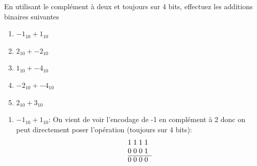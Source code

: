 \documentclass[12pt]{article}
\newenvironment{MaReponse}
		{\begin{greyedtextbox}\itshape} %
		{\end{greyedtextbox}}            %
\newenvironment{alphenum}
{\begin{enumerate}[label=\alph*.]}
	{\end{enumerate}}
\begin{document}
	\begin{MonExo}
		En utilisant le complément à deux et toujours sur 4 bits, effectuez les additions binaires suivantes
		\begin{alphenum}
			\item $-1_{10} + 1_{10}$
			\item $2_{10} + -2_{10}$
			\item $1_{10} + -4_{10}$
			\item $-2_{10} + -4_{10}$
			\item $2_{10} + 3_{10}$
		\end{alphenum}
	\end{MonExo}
	\begin{MaReponse}
		\begin{alphenum}
			\item $-1_{10} + 1_{10}$: On vient de voir l'encodage de -1 en complément à 2 donc on peut directement poser l'opération (toujours sur 4 bits):
			\[
			\begin{array}{@{}r *{4}{@{\;}c}}
				& 1 & 1 & 1 & 1 \\
				& 0 & 0 & 0 & 1  \\
				\cline{2-5}
				& 0 & 0 & 0 & 0 \\
			\end{array}
			\]
						

\end{alphenum}
\end{MaReponse}
\end{document}
